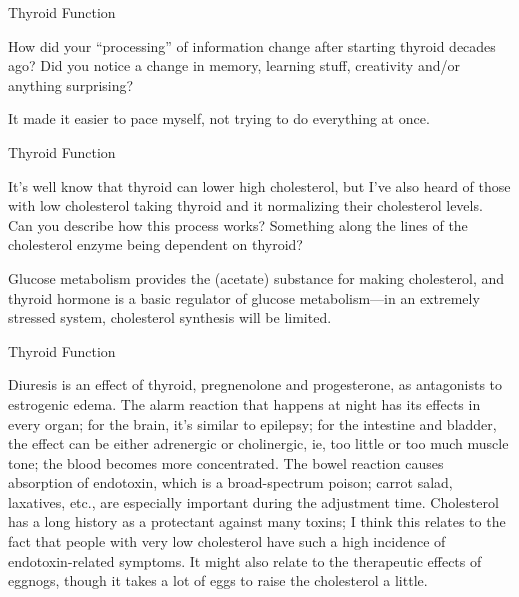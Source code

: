 \documentclass[11pt,oneside,openany,extrafontsizes]{memoir}
\begin{document}
\begin{qaexchange}{Thyroid Function}

    \begin{question}
        How did your \enquote{processing} of information change after starting thyroid decades ago? Did you notice a change in memory, learning stuff, creativity and/or anything surprising?
    \end{question}

    \begin{answer}
      It made it easier to pace myself, not trying to do everything at once.
    \end{answer}
\end{qaexchange}

\begin{qaexchange}{Thyroid Function}

    \begin{question}
        It's well know that thyroid can lower high cholesterol, but I've also heard of those with low cholesterol taking thyroid and it normalizing their cholesterol levels. Can you describe how this process works? Something along the lines of the cholesterol enzyme being dependent on thyroid?
    \end{question}

    \begin{answer}
      Glucose metabolism provides the (acetate) substance for making cholesterol, and thyroid hormone is a basic regulator of glucose metabolism---in an extremely stressed system, cholesterol synthesis will be limited.
    \end{answer}
\end{qaexchange}

\begin{standalonequote}{Thyroid Function}

    \begin{answer}
      Diuresis is an effect of thyroid, pregnenolone and progesterone, as antagonists to estrogenic edema. The alarm reaction that happens at night has its effects in every organ; for the brain, it's similar to epilepsy; for the intestine and bladder, the effect can be either adrenergic or cholinergic, ie, too little or too much muscle tone; the blood becomes more concentrated. The bowel reaction causes absorption of endotoxin, which is a broad-spectrum poison; carrot salad, laxatives, etc., are especially important during the adjustment time. Cholesterol has a long history as a protectant against many toxins; I think this relates to the fact that people with very low cholesterol have such a high incidence of endotoxin-related symptoms. It might also relate to the therapeutic effects of eggnogs, though it takes a lot of eggs to raise the cholesterol a little.
    \end{answer}
\end{standalonequote}
\end{document}

